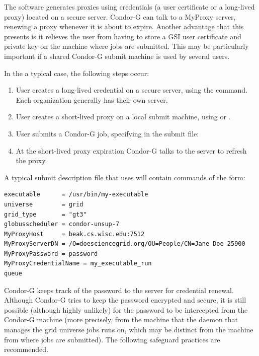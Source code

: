 The  software generates proxies using credentials
(a user certificate or a long-lived proxy) located on a secure
 server.
Condor-G can talk to a MyProxy server,
renewing a proxy whenever it is about to expire.
Another advantage that this presents is it relieves the user
from having to store a GSI user certificate and private key
on the machine where jobs are submitted.
This may be particularly important if a shared Condor-G
submit machine is used by several users.

In the a typical case, the following steps occur:

\begin{enumerate}
\item{User creates a long-lived credential}
on a secure  server, using the
 command.
Each organization generally has their own  server.

\item{User creates a short-lived proxy}
on a local submit machine,
using
 or .

\item{User submits}
a Condor-G job,
specifying in the submit file:

\item{At the short-lived proxy expiration}
Condor-G talks to
the  server to refresh the proxy.

\end{enumerate}

A typical submit description file that uses  will
contain commands of the form:
\footnotesize
\begin{verbatim}
executable      = /usr/bin/my-executable
universe        = grid
grid_type       = "gt3"
globusscheduler = condor-unsup-7
MyProxyHost     = beak.cs.wisc.edu:7512
MyProxyServerDN = /O=doesciencegrid.org/OU=People/CN=Jane Doe 25900
MyProxyPassword = password
MyProxyCredentialName = my_executable_run
queue
\end{verbatim}
\normalsize

Condor-G keeps track of the password to the  server
for credential renewal.
Although Condor-G tries to keep the password encrypted and secure,
it is still possible (although highly unlikely) for the password
to be intercepted from the Condor-G machine
(more precisely, from the machine that the
 daemon that manages the grid universe jobs runs on,
which may be distinct from the machine from where jobs are submitted).
The following safeguard practices are recommended.

